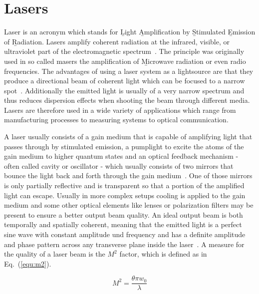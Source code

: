 \documentclass[a4paper,10pt]{article}
\newcommand{\equref}[1]{Eq.~(\ref{#1})}
\begin{document}
    \newpage

    \section{Lasers}

    Laser is an acronym which stands for \b{L}ight \b{A}mplification
    by \b{S}timulated \b{E}mission of \b{R}adiation.
    Lasers amplify coherent radiation at the infrared, visible, or
    ultraviolet part of the electromagnetic spectrum~\cite{lasers_siegman}.
    The principle was originally used in so called masers the 
    amplification of \b{M}icrowave radiation or even radio frequencies.
    The advantages of using a laser system as a lightsource are that
    they produce a directional beam of coherent light which can be 
    focused to a narrow spot~\cite{lasers_liverpool}.
    Additionally the emitted light is usually of a very narrow spectrum
    and thus reduces dispersion effects when shooting the beam through
    different media.
    Lasers are therefore used in a wide variety of applications which
    range from manufacturing processes to measuring systems to 
    optical communication.

    A laser usually consists of a gain medium that is capable of amplifying
    light that passes through by stimulated emission, a pumplight to
    excite the atoms of the gain medium to higher quantum states and
    an optical feedback mechanism - often called cavity or oscillator - 
    which usually
    consists of two mirrors that bounce the light back and forth through
    the gain medium~\cite{lasers_siegman}.
    One of those mirrors is only partially reflective and is transparent
    so that a portion of the amplified light can escape.
    Usually in more complex setups cooling is applied to the gain medium
    and some other optical elements like
    lenses or polarization filters may be present to ensure a better
    output beam quality.
    An ideal output beam is both temporally and spatially coherent,
    meaning that the emitted light is a perfect sine wave with constant
    amplitude und frequency and has a definite amplitude and phase pattern
    across any transverse plane inside the laser~\cite{lasers_siegman}.
    A measure for the quality of a laser beam is the $M^2$ factor, which
    is defined as in \equref{equ:m2}.

    \begin{equation}
        \label{equ:m2}
        M^2 = \frac{\theta \pi w_0}{\lambda}
    \end{equation}
\end{document}
